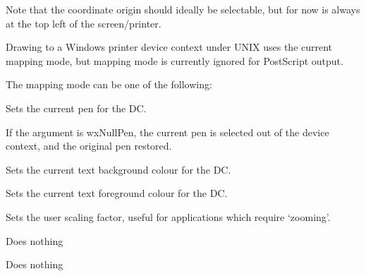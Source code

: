 Note that the coordinate origin should ideally be selectable, but for
now is always at the top left of the screen/printer.

Drawing to a Windows printer device context under UNIX
uses the current mapping mode, but mapping mode is currently ignored for
PostScript output.

The mapping mode can be one of the following:

\begin{twocollist}\itemsep=0pt
\end{twocollist}

\label{wxlatexdcsetpen}


Sets the current pen for the DC.

If the argument is wxNullPen, the current pen is selected out of the device
context, and the original pen restored.


\label{wxlatexdcsettextbackground}


Sets the current text background colour for the DC.

\label{wxlatexdcsettextforeground}


Sets the current text foreground colour for the DC.


\label{wxlatexdcsetuserscale}


Sets the user scaling factor, useful for applications which require
`zooming'.

\label{wxlatexdcstartdoc}


Does nothing

\label{wxlatexdcstartpage}


Does nothing
